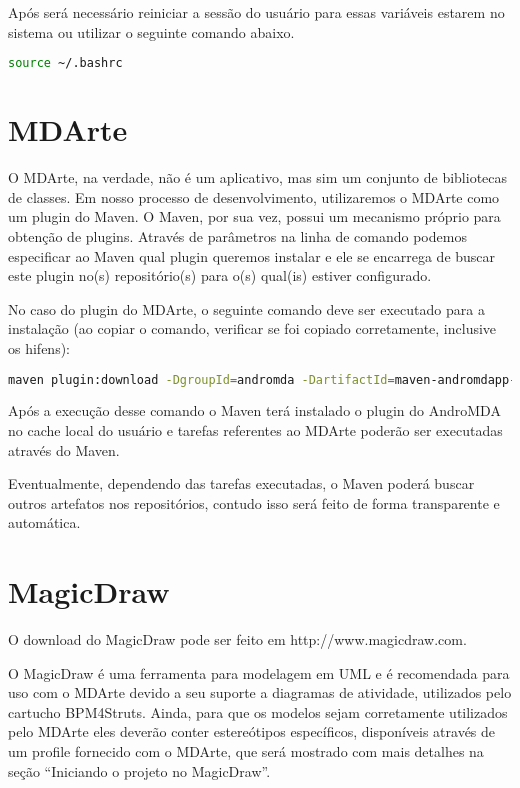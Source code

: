 Após será necessário reiniciar a sessão do usuário para essas variáveis estarem no sistema ou utilizar o seguinte comando abaixo.

\begin{lstlisting}[language=bash]
source ~/.bashrc
\end{lstlisting}

\section{MDArte}

O MDArte, na verdade, não é um aplicativo, mas sim um conjunto de bibliotecas de classes. Em nosso processo de desenvolvimento, utilizaremos o MDArte como um plugin do Maven. O Maven, por sua vez, possui um mecanismo próprio para obtenção de plugins. Através de parâmetros na linha de comando podemos especificar ao Maven qual plugin queremos instalar e ele se encarrega de buscar este plugin no(s) repositório(s) para o(s) qual(is) estiver configurado. 

No caso do plugin do MDArte, o seguinte comando deve ser executado para a instalação (ao copiar o comando, verificar se foi copiado corretamente, inclusive os hifens): 

\begin{lstlisting}[language=bash]
maven plugin:download -DgroupId=andromda -DartifactId=maven-andromdapp-plugin-coppetec -Dversion=3.1.1.3.4.19-RC2
\end{lstlisting}
	
Após a execução desse comando o Maven terá instalado o plugin do AndroMDA no cache local do usuário e tarefas referentes ao MDArte poderão ser executadas através do Maven. 

Eventualmente, dependendo das tarefas executadas, o Maven poderá buscar outros artefatos nos repositórios, contudo isso será feito de forma transparente e automática.

\section{MagicDraw}

O download do MagicDraw pode ser feito em http://www.magicdraw.com. 

O MagicDraw é uma ferramenta para modelagem em UML e é recomendada para uso com o MDArte devido a seu suporte a diagramas de atividade, utilizados pelo cartucho BPM4Struts. Ainda, para que os modelos sejam corretamente utilizados pelo MDArte eles deverão conter estereótipos específicos, disponíveis através de um profile fornecido com o MDArte, que será mostrado com mais detalhes na seção “Iniciando o projeto no MagicDraw”.

